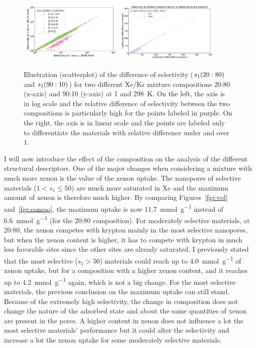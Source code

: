 \documentclass[main.tex]{subfiles}
\begin{document}
\begin{figure}[ht]
  \centering
    \includegraphics[width=0.45\textwidth]{figures/2-thermo/s_2080_vs_s_9010_overview_log.jpg}
    \includegraphics[width=0.45\textwidth]{figures/2-thermo/s_2080_vs_s_9010_overview.jpg}
    \caption{Illustration (scatterplot) of the difference of selectivity ($s_{\text{1}}(20:80)$ and $s_{\text{1}}(90:10)$) for two different Xe/Kr mixture compositions 20:80 (x-axis) and 90:10 (y-axis) at \SI{1}{\atm} and \SI{298}{\kelvin}. On the left, the axis is in log scale and the relative difference of selectivity between the two compositions is particularly high for the points labeled in purple. On the right, the axis is in linear scale and the points are labeled only to differentiate the materials with relative difference under and over $1$.}\label{fgr:SI:overview_2080_9010}
  \end{figure}

I will now introduce the effect of the composition on the analysis of the different structural descriptors. One of the major changes when considering a mixture with much more xenon is the value of the xenon uptake. The nanopores of selective materials ($1<s_1\leq 50$) are much more saturated in Xe and the maximum amount of xenon is therefore much higher. By comparing Figures~\ref{fgr:vol} and~\ref{fgr:compo}, the maximum uptake is now \SI{11.7}{\milli\mole\per\gram} instead of \SI{6.6}{\milli\mole\per\gram} (for the 20:80 composition). For moderately selective materials, at 20:80, the xenon competes with krypton mainly in the most selective nanopores, but when the xenon content is higher, it has to compete with krypton in much less favorable sites since the other sites are already saturated. I previously stated that the most selective ($s_1>50$) materials could reach up to \SI{4.0}{\milli\mole\per\gram} of xenon uptake, but for a composition with a higher xenon content, and it reaches up to \SI{4.2}{\milli\mole\per\gram} again, which is not a big change. For the most selective materials, the previous conclusion on the maximum uptake can still stand. Because of the extremely high selectivity, the change in composition does not change the nature of the adsorbed state and about the same quantities of xenon are present in the pores. A higher content in xenon does not influence a lot the most selective materials' performance but it could alter the selectivity and increase a lot the xenon uptake for some moderately selective materials.
\end{document}
